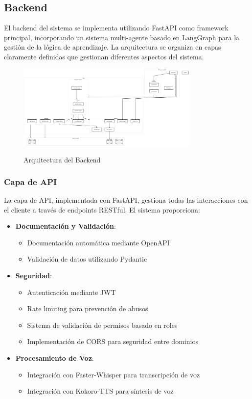 \subsection{Backend}
\label{backend}

El backend del sistema se implementa utilizando FastAPI como framework principal, incorporando un sistema multi-agente basado en LangGraph para la gestión de la lógica de aprendizaje. La arquitectura se organiza en capas claramente definidas que gestionan diferentes aspectos del sistema.

\begin{figure}[H]
	\centering
	\caption{Arquitectura del Backend}
	\includegraphics[width=0.8\textwidth]{figuras/backend.png}
	\label{fig:arquitectura-backend}
\end{figure}

\subsubsection{Capa de API}
\label{capa-api}

La capa de API, implementada con FastAPI, gestiona todas las interacciones con el cliente a través de endpoints RESTful. El sistema proporciona:

\begin{itemize}
    \item \textbf{Documentación y Validación}:
    \begin{itemize}
        \item Documentación automática mediante OpenAPI
        \item Validación de datos utilizando Pydantic
    \end{itemize}

    \item \textbf{Seguridad}:
    \begin{itemize}
        \item Autenticación mediante JWT
        \item Rate limiting para prevención de abusos
        \item Sistema de validación de permisos basado en roles
        \item Implementación de CORS para seguridad entre dominios
    \end{itemize}

    \item \textbf{Procesamiento de Voz}:
    \begin{itemize}
        \item Integración con Faster-Whisper para transcripción de voz
        \item Integración con Kokoro-TTS para síntesis de voz
    \end{itemize}
\end{itemize}
